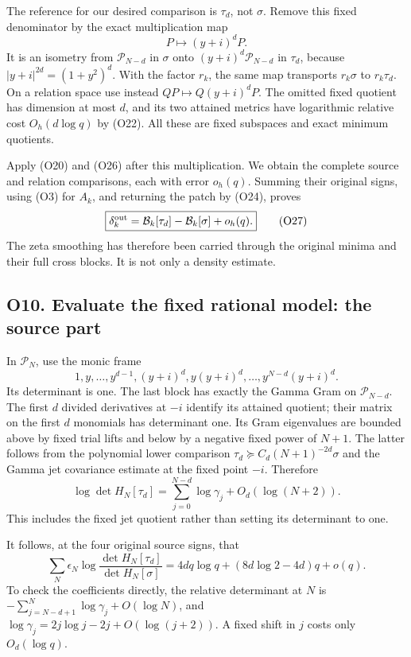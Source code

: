 \documentclass[11pt,a4paper]{article}
\begin{document}
The reference for our desired comparison is \(\tau_d\), not \(\sigma\).
Remove this fixed denominator by the exact multiplication map \[
P\longmapsto(y+i)^dP.
\] It is an isometry from \(\mathcal P_{N-d}\) in \(\sigma\) onto
\((y+i)^d\mathcal P_{N-d}\) in \(\tau_d\), because
\(|y+i|^{2d}=(1+y^2)^d\). With the factor \(r_k\), the same map
transports \(r_k\sigma\) to \(r_k\tau_d\). On a relation space use
instead \(QP\mapsto Q(y+i)^dP\). The omitted fixed quotient has
dimension at most \(d\), and its two attained metrics have logarithmic
relative cost \(O_h(d\log q)\) by (O22). All these are fixed subspaces
and exact minimum quotients.

Apply (O20) and (O26) after this multiplication. We obtain the complete
source and relation comparisons, each with error \(o_h(q)\). Summing
their original signs, using (O3) for \(A_k\), and returning the patch by
(O24), proves \[
\boxed{\delta_k^{\rm out}
=\mathcal B_k[\tau_d]-\mathcal B_k[\sigma]+o_h(q).}\tag{O27}
\] The zeta smoothing has therefore been carried through the original
minima and their full cross blocks. It is not only a density estimate.

\subsection{O10. Evaluate the fixed rational model: the source
part}\label{sa:o10.-evaluate-the-fixed-rational-model-the-source-part}

In \(\mathcal P_N\), use the monic frame \[
1,y,\ldots,y^{d-1},(y+i)^d,y(y+i)^d,\ldots,y^{N-d}(y+i)^d.
\] Its determinant is one. The last block has exactly the Gamma Gram on
\(\mathcal P_{N-d}\). The first \(d\) divided derivatives at \(-i\)
identify its attained quotient; their matrix on the first \(d\)
monomials has determinant one. Its Gram eigenvalues are bounded above by
fixed trial lifts and below by a negative fixed power of \(N+1\). The
latter follows from the polynomial lower comparison
\(\tau_d\succeq C_d(N+1)^{-2d}\sigma\) and the Gamma jet covariance
estimate at the fixed point \(-i\). Therefore \[
\log\det H_N[\tau_d]
=\sum_{j=0}^{N-d}\log\gamma_j+O_d(\log(N+2)).\tag{O28}
\] This includes the fixed jet quotient rather than setting its
determinant to one.

It follows, at the four original source signs, that \[
\boxed{\sum_N\epsilon_N\log\frac{\det H_N[\tau_d]}{\det H_N[\sigma]}
=4dq\log q+(8d\log2-4d)q+o(q).}\tag{O29}
\] To check the coefficients directly, the relative determinant at \(N\)
is \(-\sum_{j=N-d+1}^{N}\log\gamma_j+O(\log N)\), and
\(\log\gamma_j=2j\log j-2j+O(\log(j+2))\). A fixed shift in \(j\) costs
only \(O_d(\log q)\).
\end{document}

